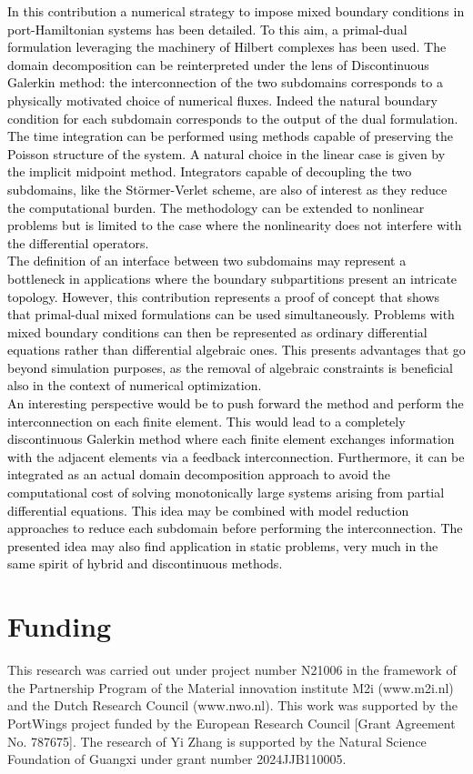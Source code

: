 \documentclass[11pt,a4paper]{article}
\newcommand{\revthree}[1]{{\textcolor{black}{#1}}}
\begin{document}
\revthree{
In this contribution a numerical strategy to impose mixed boundary conditions in port-Hamiltonian systems has been detailed. To this aim, a primal-dual formulation leveraging the machinery of Hilbert complexes has been used. The domain decomposition can be reinterpreted under the lens of Discontinuous Galerkin method: the interconnection of the two subdomains corresponds to a physically motivated choice of numerical fluxes. Indeed the natural boundary condition for each subdomain corresponds to the output of the dual formulation. The time integration can be performed using methods capable of preserving the Poisson structure of the system. A natural choice in the linear case is given by the implicit midpoint method. Integrators capable of decoupling the two subdomains, like the St\"ormer-Verlet scheme, are also of interest as they reduce the computational burden. The methodology can be extended to nonlinear problems but is limited to the case where the nonlinearity does not interfere with the differential operators. \\
The definition of an interface between two subdomains may represent a bottleneck in applications where the boundary subpartitions present an intricate topology. However, this contribution represents a proof of concept that shows that primal-dual mixed formulations can be used simultaneously. Problems with mixed boundary conditions can then be represented as ordinary differential equations rather than differential algebraic ones. This presents advantages that go beyond simulation purposes, as the removal of algebraic constraints is beneficial also in the context of numerical optimization.\\
An interesting perspective would be to push forward the method and perform the interconnection on each finite element. This would lead to a completely discontinuous Galerkin method where each finite element exchanges information with the adjacent elements via a feedback interconnection. Furthermore, it can be integrated as an actual domain decomposition approach to avoid the computational cost of solving monotonically large systems arising from partial differential equations. This idea may be combined with model reduction approaches to reduce each subdomain before performing the interconnection. The presented idea may also find application in static problems, very much in the same spirit of hybrid and discontinuous methods.
}


\section*{Funding}
This research was carried out under project number N21006 in the framework of the Partnership Program of the Material innovation institute M2i (www.m2i.nl) and the Dutch Research Council (www.nwo.nl). This work was supported by the PortWings project funded by the European Research Council [Grant Agreement No. 787675]. The research of Yi Zhang is supported by the Natural Science Foundation of Guangxi under grant number 2024JJB110005.
\end{document}

